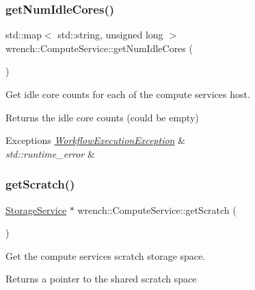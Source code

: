 \subsubsection{\texorpdfstring{get\+Num\+Idle\+Cores()}{getNumIdleCores()}}
{\footnotesize\ttfamily std\+::map$<$ std\+::string, unsigned long $>$ wrench\+::\+Compute\+Service\+::get\+Num\+Idle\+Cores (\begin{DoxyParamCaption}{ }\end{DoxyParamCaption})}



Get idle core counts for each of the compute service\textquotesingle{}s host. 

\begin{DoxyReturn}{Returns}
the idle core counts (could be empty)
\end{DoxyReturn}

\begin{DoxyExceptions}{Exceptions}
{\em \hyperlink{classwrench_1_1_workflow_execution_exception}{Workflow\+Execution\+Exception}} & \\
\hline
{\em std\+::runtime\+\_\+error} & \\
\hline
\end{DoxyExceptions}
\mbox{\label{classwrench_1_1_compute_service_a751da474fe424957a614116cef6a5e13}} 
\subsubsection{\texorpdfstring{get\+Scratch()}{getScratch()}}
{\footnotesize\ttfamily \hyperlink{classwrench_1_1_storage_service}{Storage\+Service} $\ast$ wrench\+::\+Compute\+Service\+::get\+Scratch (\begin{DoxyParamCaption}{ }\end{DoxyParamCaption})}



Get the compute service\textquotesingle{}s scratch storage space. 

\begin{DoxyReturn}{Returns}
a pointer to the shared scratch space 
\end{DoxyReturn}
\mbox{\label{classwrench_1_1_compute_service_a6532846cd02094b6095341d37d5b2bf7}} 
